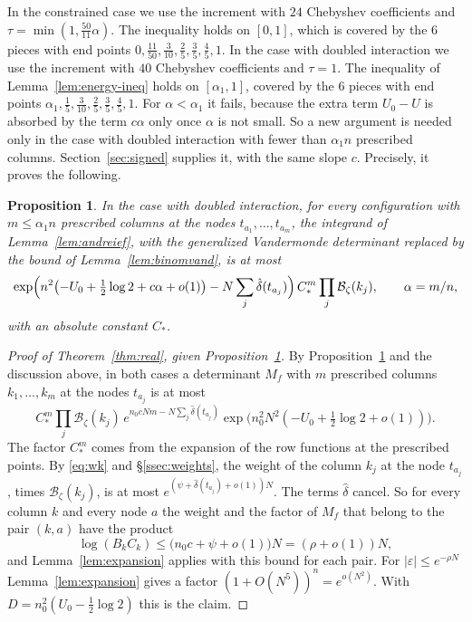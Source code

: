 \documentclass[11pt]{amsart}
\newtheorem{proposition}[theorem]{Proposition}
\theoremstyle{definition}
\theoremstyle{remark}
\numberwithin{equation}{section}
\begin{document}
In the constrained case we use the increment with $24$ Chebyshev coefficients and $\tau=\min(1,\frac{50}{11}\alpha)$. The
inequality holds on $[0,1]$, which is covered by the $6$ pieces with end points $0,\frac{11}{50},\frac3{10},\frac25,\frac35,\frac45,1$.
In the case with doubled interaction we use the increment with $40$ Chebyshev coefficients and $\tau=1$. The inequality
of Lemma~\ref{lem:energy-ineq} holds on $[\alpha_1,1]$, covered by the $6$ pieces with end points
$\alpha_1,\frac15,\frac3{10},\frac25,\frac35,\frac45,1$. For $\alpha<\alpha_1$ it fails, because the extra term
$U_0-U$ is absorbed by the term $c\alpha$ only once $\alpha$ is not small. So a new argument is needed only in the case
with doubled interaction with fewer than $\alpha_1n$ prescribed columns. Section~\ref{sec:signed} supplies it, with the
same slope $c$. Precisely, it proves the following.

\begin{proposition}\label{prop:signed-goal}
In the case with doubled interaction, for every configuration with $m\le\alpha_1n$ prescribed columns at the nodes
$t_{a_1},\ldots,t_{a_m}$, the integrand of Lemma~\ref{lem:andreief}, with the generalized Vandermonde determinant replaced by
the bound of Lemma~\ref{lem:binomvand}, is at most
\[
 \exp\Bigl(n^2\bigl(-U_0+\tfrac12\log2+c\alpha+o(1)\bigr)-N\sum_j\hat\delta(t_{a_j})\Bigr)\,C_*^m\prod_j\mathcal B_\zeta(k_j),\qquad \alpha=m/n,
\]
with an absolute constant $C_*$.
\end{proposition}

\begin{proof}[Proof of Theorem~\ref{thm:real}, given Proposition~\ref{prop:signed-goal}]
By Proposition~\ref{prop:signed-goal} and the discussion above, in both cases a determinant $M_f$ with $m$
prescribed columns $k_1,\ldots,k_m$ at the nodes $t_{a_j}$ is at most
\[
 C_*^m\prod_j\mathcal B_\zeta(k_j)\,e^{n_0cNm-N\sum_j\hat\delta(t_{a_j})}\exp\bigl(n_0^2N^2(-U_0+\tfrac12\log2+o(1))\bigr).
\]
The factor $C_*^m$ comes from the expansion of the row functions at the prescribed points. By \eqref{eq:wk} and
\S\ref{ssec:weights}, the weight of the column $k_j$ at the node $t_{a_j}$, times $\mathcal B_\zeta(k_j)$, is at most
$e^{(\psi+\hat\delta(t_{a_j})+o(1))N}$. The terms $\hat\delta$ cancel. So for every column $k$ and every node $a$
the weight and the factor of $M_f$ that belong to the pair $(k,a)$ have the product
\[
 \log(B_kC_k)\le\bigl(n_0c+\psi+o(1)\bigr)N=(\rho+o(1))N ,
\]
and Lemma~\ref{lem:expansion} applies with this bound for each pair.
For $|\varepsilon|\le e^{-\rho N}$ Lemma~\ref{lem:expansion} gives a factor $(1+O(N^5))^n=e^{o(N^2)}$. With
$D=n_0^2(U_0-\frac12\log2)$ this is the claim.
\end{proof}
\end{document}

